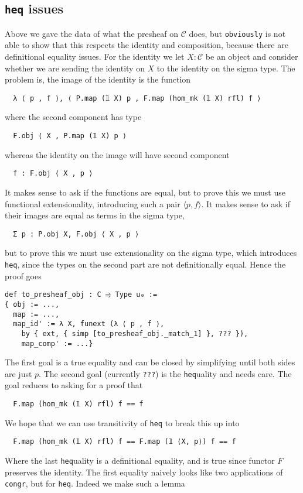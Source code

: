\documentclass{article}
\newcommand{\CC}{\mathcal{C}}
\newcommand{\<}{\langle}
\renewcommand{\>}{\rangle}
\theoremstyle{definitionstyle}
\theoremstyle{exercisestyle}
\theoremstyle{remarkstyle}
\begin{document}
\subsection{\texttt{heq} issues}
Above we gave the data of what the presheaf on $\CC$ does,
but \texttt{obviously} is not able to show that this respects the identity
and composition, because there are definitional equality issues.
For the identity we let $X : \CC$ be an object and consider whether
we are sending the identity on $X$ to the identity on the sigma type.
The problem is, the image of the identity is the function
\begin{lstlisting}
  λ ⟨ p , f ⟩, ⟨ P.map (𝟙 X) p , F.map (hom_mk (𝟙 X) rfl) f ⟩ \end{lstlisting}
where the second component has type
\begin{lstlisting}
  F.obj ⟨ X , P.map (𝟙 X) p ⟩ \end{lstlisting}
whereas the identity on the image will have second component
\begin{lstlisting}
  f : F.obj ⟨ X , p ⟩ \end{lstlisting}
It makes sense to ask if the functions are equal,
but to prove this we must use functional extensionality,
introducing such a pair $\< p , f \>$.
It makes sense to ask if their images are equal as terms in the sigma type,
\begin{lstlisting}
  Σ p : P.obj X, F.obj ⟨ X , p ⟩ \end{lstlisting}
but to prove this we must use extensionality on the sigma type,
which introduces \texttt{heq}, since the types on the second part are not
definitionally equal.
Hence the proof goes
\begin{lstlisting}
def to_presheaf_obj : C ⥤ Type u₀ :=
{ obj := ...,
  map := ...,
  map_id' := λ X, funext (λ ⟨ p , f ⟩,
    by { ext, { simp [to_presheaf_obj._match_1] }, ??? }),
    map_comp' := ...} \end{lstlisting}
The first goal is a true equality and can be closed by simplifying
until both sides are just $p$.
The second goal (currently \texttt{???}) is the
\texttt{heq}uality and needs care.
The goal reduces to asking for a proof that
\begin{lstlisting}
  F.map (hom_mk (𝟙 X) rfl) f == f \end{lstlisting}
We hope that we can use transitivity of \texttt{heq} to break this up into
\begin{lstlisting}
  F.map (hom_mk (𝟙 X) rfl) f == F.map (𝟙 ⟨X, p⟩) f == f \end{lstlisting}
Where the last \texttt{heq}uality is a definitional equality,
and is true since functor $F$ preserves the identity.
The first equality naively looks like two applications of \texttt{congr},
but for \texttt{heq}.
Indeed we make such a lemma
\end{document}
